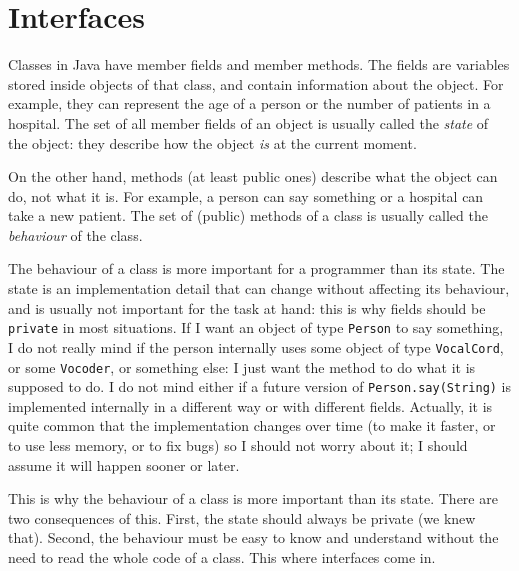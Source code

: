 %    
% 

\section{Interfaces}
\label{sec:interfaces}

Classes in Java have member fields and member methods. The fields are
variables stored inside objects of that class, and contain
information about the object. For example, they can represent the age
of a person or the number of patients in a hospital. The set of all
member fields of an object is usually called the \emph{state} of the
object: they describe how the object \emph{is} at the current moment. 

On the other hand, methods (at least public ones) describe what the
object can do, not what it is. 
For example, a person can say something or a hospital can take
a new patient. The set of (public) methods of a class is usually
called the \emph{behaviour} of the class. 

The behaviour of a class is more important for a programmer than its
state. The state is an implementation detail that can change without
affecting its behaviour, and is usually not important for the task at
hand: this is why fields should be \verb+private+ in most
situations. If I want an object of type \verb+Person+ to say
something, I do not really mind if the person internally uses some
object of type \verb+VocalCord+, or some \verb+Vocoder+, or something
else: I just want the method to do what it is supposed to do. I do not
mind either if a future version of \verb+Person.say(String)+ is
implemented internally in a different way or with different
fields. Actually, it is quite common that the implementation changes
over time (to make it faster, or to use less memory, or to fix bugs)
so I should not worry about it; I should assume it will happen sooner
or later. 

This is why the behaviour of a class is more important than its
state. There are two consequences of this. First, the state should
always be private (we knew that). 
Second, the behaviour must be easy to know and
understand without the need to read the whole code of a class. This
where interfaces come in. 

